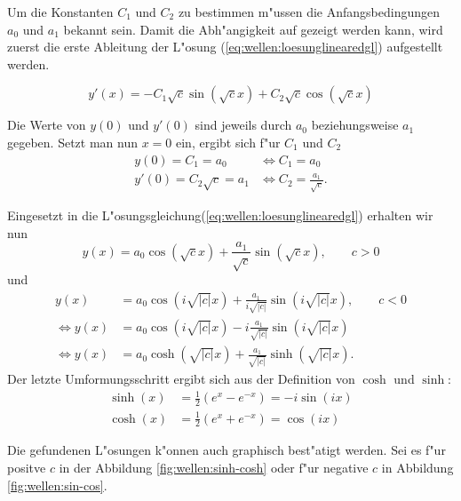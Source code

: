Um die Konstanten $C_1$ und $C_2$ zu bestimmen m"ussen die Anfangsbedingungen 
$a_0$ und $a_1$ bekannt sein. Damit die Abh"angigkeit auf gezeigt werden kann, 
wird zuerst die erste Ableitung der L"osung (\ref{eq:wellen:loesunglinearedgl}) 
aufgestellt werden.

\begin{equation}
	y'(x)=-C_1 \sqrt{c} \sin(\sqrt{c}x) + C_2 \sqrt{c} \cos(\sqrt{c}x)
\end{equation}

Die Werte von $y(0)$ und $y'(0)$ sind jeweils durch $a_0$ beziehungsweise $a_1$ 
gegeben. Setzt man nun $x = 0$ ein, ergibt sich f"ur $C_1$ und $C_2$
\begin{equation}
	\begin{split}
		y(0) = C_1 = a_0 &\Leftrightarrow C_1 = a_0 \\
		y'(0) = C_2 \sqrt{c} = a_1 &\Leftrightarrow C_2 = \frac{a_1}{\sqrt{c}}.
	\end{split}
\end{equation}

Eingesetzt in die L"osungsgleichung(\ref{eq:wellen:loesunglinearedgl}) erhalten 
wir nun
\begin{equation*}
	y(x) = a_0 \cos(\sqrt{c}x) + \frac{a_1}{\sqrt{c}} \sin(\sqrt{c}x), \qquad c 
	> 0
\end{equation*}
und
\begin{equation}
	\begin{split}
		y(x) &= a_0 \cos(i\sqrt{|c|}x) + 
		\frac{a_1}{i\sqrt{|c|}}\sin(i\sqrt{|c|}x), \qquad c < 0\\
		\Leftrightarrow
		y(x) &= a_0 \cos(i\sqrt{|c|}x) - 
		i\frac{a_1}{\sqrt{|c|}}\sin(i\sqrt{|c|}x)\\
		\Leftrightarrow
		y(x) &= a_0 \cosh(\sqrt{|c|}x) + 
		\frac{a_1}{\sqrt{|c|}}\sinh(\sqrt{|c|}x).
	\end{split}	
\end{equation}
Der letzte Umformungsschritt ergibt sich aus der Definition von $\cosh$ und 
$\sinh$:
\begin{equation*}
	\begin{split}
		\sinh(x) &= \frac{1}{2} (e^x - e^{-x}) = -i \sin(ix)\\
		\cosh(x) &= \frac{1}{2} (e^x + e^{-x}) = \cos (ix)
	\end{split}
\end{equation*}

Die gefundenen L"osungen k"onnen auch graphisch best"atigt werden. Sei es f"ur 
positve $c$ in der Abbildung \ref{fig:wellen:sinh-cosh} oder f"ur negative $c$ 
in Abbildung \ref{fig:wellen:sin-cos}.

